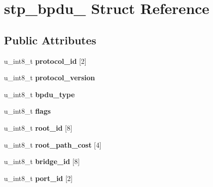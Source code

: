 \hypertarget{structstp__bpdu__}{
\section{stp\_\-bpdu\_\- Struct Reference}
\label{structstp__bpdu__}
}
\subsection*{Public Attributes}
\begin{DoxyCompactItemize}
\item 
\hypertarget{structstp__bpdu___ae5d0492789714a4a33d8c041ab7a7779}{
u\_\-int8\_\-t {\bfseries protocol\_\-id} \mbox{[}2\mbox{]}}
\label{structstp__bpdu___ae5d0492789714a4a33d8c041ab7a7779}

\item 
\hypertarget{structstp__bpdu___ad3e4bc6e77f9cd940b52bdad597775a0}{
u\_\-int8\_\-t {\bfseries protocol\_\-version}}
\label{structstp__bpdu___ad3e4bc6e77f9cd940b52bdad597775a0}

\item 
\hypertarget{structstp__bpdu___ab17cc074543ce1843f17ac5e69d00715}{
u\_\-int8\_\-t {\bfseries bpdu\_\-type}}
\label{structstp__bpdu___ab17cc074543ce1843f17ac5e69d00715}

\item 
\hypertarget{structstp__bpdu___a1288668e8cca6ec4c8208a0b7239b315}{
u\_\-int8\_\-t {\bfseries flags}}
\label{structstp__bpdu___a1288668e8cca6ec4c8208a0b7239b315}

\item 
\hypertarget{structstp__bpdu___a2f83a6216acc3336c131e84e2ed85817}{
u\_\-int8\_\-t {\bfseries root\_\-id} \mbox{[}8\mbox{]}}
\label{structstp__bpdu___a2f83a6216acc3336c131e84e2ed85817}

\item 
\hypertarget{structstp__bpdu___a7faf01ef68887ae5ecc6d406021c6d1e}{
u\_\-int8\_\-t {\bfseries root\_\-path\_\-cost} \mbox{[}4\mbox{]}}
\label{structstp__bpdu___a7faf01ef68887ae5ecc6d406021c6d1e}

\item 
\hypertarget{structstp__bpdu___a07715d81a7881f8cc7073624f9d855e1}{
u\_\-int8\_\-t {\bfseries bridge\_\-id} \mbox{[}8\mbox{]}}
\label{structstp__bpdu___a07715d81a7881f8cc7073624f9d855e1}

\item 
\hypertarget{structstp__bpdu___a8153598354b5e7c3043b2f70d7bd1755}{
u\_\-int8\_\-t {\bfseries port\_\-id} \mbox{[}2\mbox{]}}
\label{structstp__bpdu___a8153598354b5e7c3043b2f70d7bd1755}


\end{DoxyCompactItemize}
